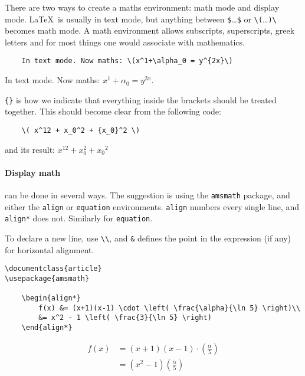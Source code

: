 There are two ways to create a maths environment: math mode and display mode.
\LaTeX\ is usually in text mode, but anything between \verb|$|\dots\verb|$| or \verb|\(|\dots \verb|)\| becomes math mode\footnotemark.
A math environment allows subscripts, superscripts, greek letters and for most things one would associate with mathematics.
\begin{lstlisting}
    In text mode. Now maths: \(x^1+\alpha_0 = y^{2x}\)
\end{lstlisting}

In text mode. Now maths: \(x^1+\alpha_0 = y^{2x}\).

\verb|{}| is how we indicate that everything inside the brackets should be treated together.
This should become clear from the following code:
\begin{lstlisting}
    \( x^12 + x_0^2 + {x_0}^2 \)
\end{lstlisting}
and its result: \( x^12 + x_0^2 + {x_0}^2 \)

\paragraph{Display math} can be done in several ways.
The suggestion is using the \verb|amsmath| package, and either the \verb|align| or \verb|equation| environments.
\texttt{align} numbers every single line, and \texttt{align*} does not. Similarly for \verb|equation|.

To declare a new line, use \verb|\\|, and \verb|&| defines the point in the expression (if any) for horizontal alignment.
\begin{lstlisting}
\documentclass{article}
\usepackage{amsmath}

    \begin{align*}
        f(x) &= (x+1)(x-1) \cdot \left( \frac{\alpha}{\ln 5} \right)\\
        &= x^2 - 1 \left( \frac{3}{\ln 5} \right)
    \end{align*}

\end{lstlisting}
\begin{align*}
    f(x) &= (x+1)(x-1) \cdot \left( \frac{\alpha}{5} \right)\\
    &= (x^2 - 1)  (\frac{\alpha}{5} )
\end{align*}

